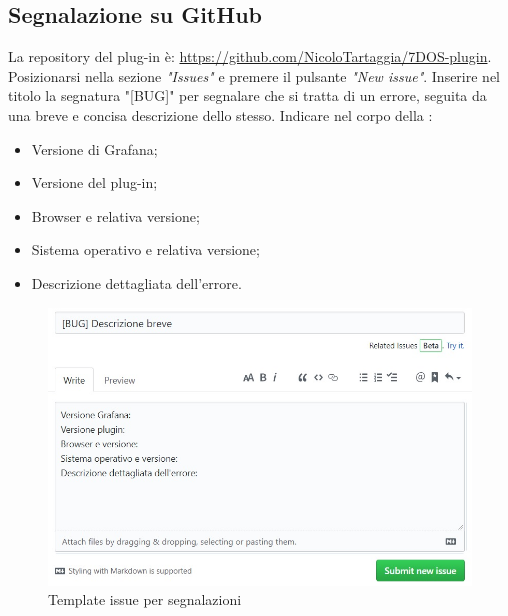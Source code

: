 \subsection{Segnalazione su GitHub}

La repository del plug-in è: \url{https://github.com/NicoloTartaggia/7DOS-plugin}. \\
Posizionarsi nella sezione \emph{"Issues"} e premere il pulsante \emph{"New issue"}. Inserire nel titolo la segnatura "[BUG]" per segnalare che si tratta di un errore, seguita da una breve e concisa descrizione dello stesso.
Indicare nel corpo della :
\begin{itemize}
	\item Versione di Grafana;
	\item Versione del plug-in;
	\item Browser e relativa versione;
	\item Sistema operativo e relativa versione;
	\item Descrizione dettagliata dell'errore.
\end{itemize}
\begin{figure} [H]
	\centering
	\includegraphics[scale=0.9]{Img/issue.jpg} 
	\caption{Template issue per segnalazioni} \label{} 
\end{figure} 

\newpage